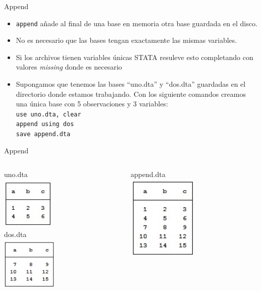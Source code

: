 \documentclass{beamer}
\begin{document}
\begin{frame}{Append}
\begin{itemize}
\item \texttt{append} añade al final de una base en memoria otra base guardada en el disco.
\item No es necesario que las bases tengan exactamente las mismas variables.
\item Si los archivos tienen variables únicas STATA resuleve esto completando con valores \textit{missing} donde es necesario
\item Supongamos que tenemos las bases ``uno.dta'' y ``dos.dta'' guardadas en el directorio donde estamos trabajando. Con los siguiente comandos creamos una única base con 5 observaciones y 3 variables:\\\smallskip
\texttt{use uno.dta, clear}\\
\texttt{append using dos}\\
\texttt{save append.dta}
\end{itemize}
\end{frame}

\begin{frame}{Append}
\begin{columns}
\begin{column}{5cm}
uno.dta\\
\includegraphics[height=2.5cm]{uno.jpg}\\\bigskip
dos.dta\\
\includegraphics[height=2.5cm]{dos.jpg}
\end{column}
\begin{column}{5cm}
append.dta\\
\includegraphics[height=4cm]{append.jpg}
\end{column}
\end{columns}
\end{frame}
\end{document}
